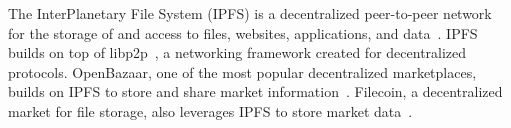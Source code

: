 The InterPlanetary File System (IPFS) is a decentralized peer-to-peer network for the storage of and access to files, websites, applications, and data~\cite{benet2014ipfs}.
IPFS builds on top of libp2p~\cite{benet2018libp2p}, a networking framework created for decentralized protocols.
OpenBazaar, one of the most popular decentralized marketplaces, builds on IPFS to store and share market information~\cite{openbazaar}.
Filecoin, a decentralized market for file storage, also leverages IPFS to store market data~\cite{benet2018filecoin}.

